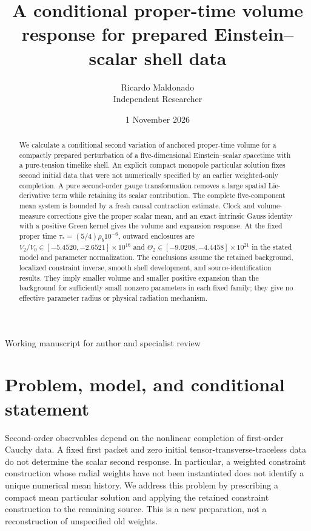 \documentclass[11pt]{article}
\title{A conditional proper-time volume response for prepared Einstein--scalar shell data}
\author{Ricardo Maldonado\\\small Independent Researcher}
\date{1 November 2026}
\begin{document}
\maketitle
\begin{center}\small Working manuscript for author and specialist review\end{center}
\begin{abstract}
We calculate a conditional second variation of anchored proper-time volume
for a compactly prepared perturbation of a five-dimensional Einstein--scalar
spacetime with a pure-tension timelike shell. An explicit compact monopole
particular solution fixes second initial data that were not numerically
specified by an earlier weighted-only completion. A pure second-order gauge
transformation removes a large spatial Lie-derivative term while retaining
its scalar contribution. The complete five-component mean system is bounded
by a fresh causal contraction estimate. Clock and volume-measure corrections
give the proper scalar mean, and an exact intrinsic Gauss identity with a
positive Green kernel gives the volume and expansion response. At the fixed
proper time $\tau_*=(5/4)\rho_b10^{-6}$, outward enclosures are
$V_2/V_0\in[-5.4520,-2.6521]\times10^{16}$ and
$\Theta_2\in[-9.0208,-4.4458]\times10^{21}$ in the stated model and parameter
normalization. The conclusions assume the retained background, localized
constraint inverse, smooth shell development, and source-identification
results. They imply smaller volume and smaller positive expansion than the
background for sufficiently small nonzero parameters in each fixed family;
they give no effective parameter radius or physical radiation mechanism.
\end{abstract}

\section{Problem, model, and conditional statement}

Second-order observables depend on the nonlinear completion of first-order
Cauchy data. A fixed first packet and zero initial tensor-transverse-traceless
data do not determine the scalar second response. In particular, a weighted
constraint construction whose radial weights have not been instantiated
does not identify a unique numerical mean history. We address this problem
by prescribing a compact mean particular solution and applying the retained
constraint construction to the remaining source. This is a new preparation,
not a reconstruction of unspecified old weights.
\end{document}
